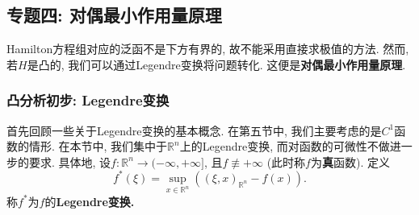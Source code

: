 \subsection{专题四: 对偶最小作用量原理}

Hamilton方程组对应的泛函不是下方有界的, 故不能采用直接求极值的方法. 然而, 若$H$是凸的, 我们可以通过Legendre变换将问题转化.
这便是\textbf{对偶最小作用量原理}.

\subsubsection{凸分析初步: Legendre变换}

首先回顾一些关于Legendre变换的基本概念. 在第五节中, 我们主要考虑的是$C^1$函数的情形.
在本节中, 我们集中于$\mathbb{R}^n$上的Legendre变换, 而对函数的可微性不做进一步的要求.
具体地, 设$f\colon \mathbb{R}^n \rightarrow (-\infty, +\infty]$, 且$f \not\equiv +\infty$ (此时称$f$为\textbf{真}函数).
定义 
\begin{equation*}
    \boxed{f^*(\xi) = \sup_{x \in \mathbb{R}^n}((\xi, x)_{\mathbb{R}^n} - f(x))}.
\end{equation*}
称$f^*$为$f$的\textbf{Legendre变换.}


